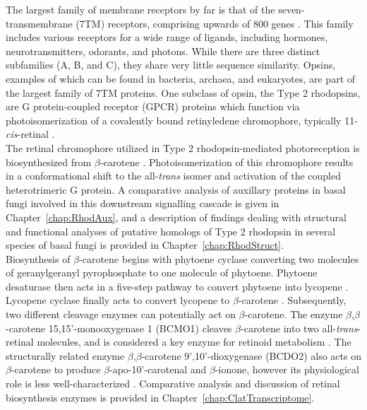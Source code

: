 \indent The largest family of membrane receptors by far is that of the seven-transmembrane (7TM) receptors, comprising upwards of 800 genes \cite{Pierce2002}. This family includes various receptors for a wide range of ligands, including hormones, neurotransmitters, odorants, and photons. While there are three distinct subfamilies (A, B, and C), they share very little sequence similarity. Opsins, examples of which can be found in bacteria, archaea, and eukaryotes, are part of the largest family of 7TM proteins. One subclass of opsin, the Type 2 rhodopsins, are G protein-coupled receptor (GPCR) proteins which function via photoisomerization of a covalently bound retinyledene chromophore, typically 11-\textit{cis}-retinal \cite{Wald1968}.\\
\indent The retinal chromophore utilized in Type 2 rhodopsin-mediated photoreception is biosynthesized from $\beta$-carotene \cite{VonLintig2000}. Photoisomerization of this chromophore results in a conformational shift to the all-\textit{trans} isomer \cite{Smith2010} and activation of the coupled heterotrimeric G protein. A comparative analysis of auxillary proteins in basal fungi involved in this downstream signalling cascade is given in Chapter~\ref{chap:RhodAux}, and a description of findings dealing with structural and functional analyses of putative homologs of Type 2 rhodopsin in several species of basal fungi is provided in Chapter~\ref{chap:RhodStruct}.\\
\indent Biosynthesis of $\beta$-carotene begins with phytoene cyclase
converting two molecules of geranylgeranyl pyrophosphate to one
molecule of phytoene. Phytoene desaturase then acts in a five-step pathway to convert phytoene into lycopene \cite{Hausmann2000}. Lycopene cyclase finally acts to convert lycopene to $\beta$-carotene \cite{Cunningham1994}. Subsequently, two different cleavage enzymes can potentially act on $\beta$-carotene. The enzyme $\beta$,$\beta$-carotene 15,15'-monooxygenase 1 (BCMO1) cleaves $\beta$-carotene into two all-\textit{trans}-retinal molecules, and is considered a key enzyme for retinoid metabolism \cite{Lietz2012}. The structurally related enzyme $\beta$,$\beta$-carotene 9',10'-dioxygenase (BCDO2) also acts on $\beta$-carotene to produce $\beta$-apo-10'-carotenal and $\beta$-ionone, however its physiological role is less well-characterized \cite{Lobo2012}. Comparative analysis and discussion of retinal biosynthesis enzymes is provided in Chapter~\ref{chap:ClatTranscriptome}.\\

